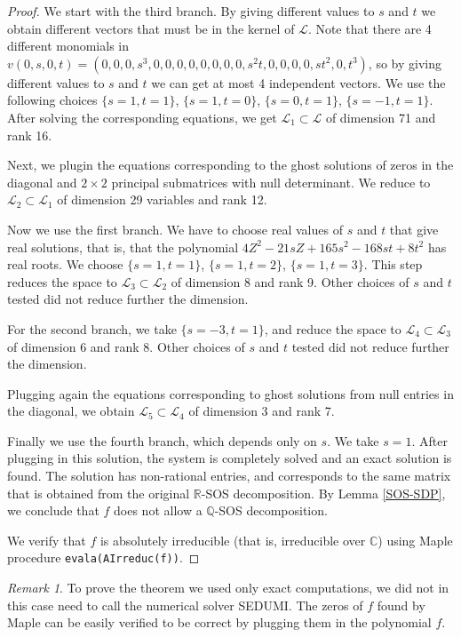 \documentclass{amsart}
\theoremstyle{definition}
\theoremstyle{remark}
\newtheorem{remark}[theorem]{Remark}
\numberwithin{equation}{section}
\newcommand{\C}{{\mathbb C}}
\newcommand{\eLL}{{\mathcal L}}
\newcommand{\Q}{{\mathbb Q}}
\newcommand{\R}{{\mathbb R}}
\begin{document}
\begin{proof}
We start with the third branch. By giving different values to $s$ and $t$ we obtain different vectors that must be in the kernel of $\eLL$. Note that there are 4 different monomials in $v(0,s,0,t) = (0, 0, 0, s^3, 0, 0, 0, 0, 0, 0, 0, 0, s^2t, 0, 0, 0, 0, st^2, 0, t^3)$, so by giving different values to $s$ and $t$ we can get at most 4 independent vectors. We use the following choices $\{s = 1, t = 1\}$, $\{s = 1, t = 0\}$, $\{s = 0, t = 1\}$, $\{s = -1, t = 1\}$. After solving the corresponding equations, we get $\eLL_1 \subset \eLL$ of dimension 71 and rank 16.

Next, we plugin the equations corresponding to the ghost solutions of zeros in the diagonal and $2 \times 2$ principal submatrices with null determinant. We reduce to $\eLL_2 \subset \eLL_1$ of dimension 29 variables and rank 12.

Now we use the first branch. We have to choose real values of $s$ and $t$ that give real solutions, that is, that the polynomial $4Z^2-21sZ+165s^2-168st+8t^2$ has real roots. We choose $\{s=1, t= 1\}$, $\{s=1, t = 2\}$, $\{s=1, t = 3\}$. This step reduces the space to $\eLL_3 \subset \eLL_2$ of dimension 8 and rank 9. Other choices of $s$ and $t$ tested did not reduce further the dimension.

For the second branch, we take $\{s=-3, t = 1\}$, and reduce the space to $\eLL_4 \subset \eLL_3$ of dimension 6 and rank 8. Other choices of $s$ and $t$ tested did not reduce further the dimension.

Plugging again the equations corresponding to ghost solutions from null entries in the diagonal, we obtain $\eLL_5 \subset \eLL_4$ of dimension 3 and rank 7.

Finally we use the fourth branch, which depends only on $s$. We take $s = 1$. After plugging in this solution, the system is completely solved and an exact solution is found. The solution has non-rational entries, and corresponds to the same matrix that is obtained from the original $\R$-SOS decomposition. By Lemma \ref{SOS-SDP}, we conclude that $f$ does not allow a $\Q$-SOS decomposition.

We verify that $f$ is absolutely irreducible (that is, irreducible over $\C$) using Maple procedure \texttt{evala(AIrreduc(f))}.
\end{proof}

\begin{remark}
   To prove the theorem we used only exact computations, we did not in this case need to call the numerical solver SEDUMI. The zeros of $f$ found by Maple can be easily verified to be correct by plugging them in the polynomial $f$.
\end{remark}
\end{document}
